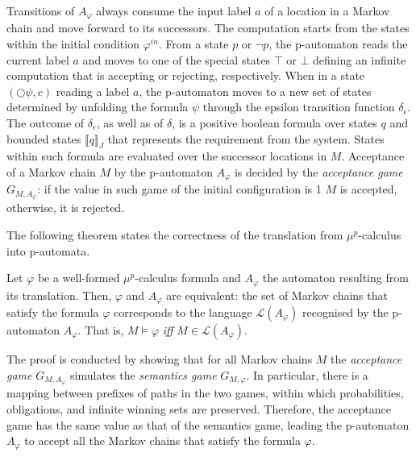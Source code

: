 \documentclass[a4paper,UKenglish]{oasics-v2016}
\begin{document}
Transitions of $A_\varphi$ always consume the input label $a$ of a 
location in a Markov chain and move forward to its successors.
The computation starts from the states within the initial condition 
$\varphi^{in}$.
From a state $p$ or $\neg p$, the p-automaton reads the current label $a$ and 
moves to one of the special states $\top$ or $\bot$ defining an infinite 
computation that is accepting or rejecting, respectively.
When in a state $(\bigcirc \psi, c)$ reading a label $a$, the p-automaton moves 
to a new set of states determined by unfolding the formula $\psi$ through the 
epsilon transition function $\delta_\epsilon$.
The outcome of $\delta_\epsilon$, as well as of $\delta$, is a positive boolean 
formula over states $q$ and bounded states $\llbracket q \rrbracket_J$ that 
represents the requirement from the system.
States within such formula are evaluated over the successor locations in $M$.
Acceptance of a Markov chain $M$ by the p-automaton $A_\varphi$ is decided by 
the \emph{acceptance game} $G_{M,A_\varphi}$: if the value in such game of the 
initial configuration is 1 $M$ is accepted, otherwise, it is rejected. 
%

The following theorem states the correctness of the translation 
from $\mu^p$-calculus into p-automata.
\begin{theorem}\label{the:MupToPaut}
	Let $\varphi$ be a well-formed $\mu^p$-calculus formula and $A_\varphi$ the 
	automaton resulting from its translation. 
	Then, $\varphi$ and $A_\varphi$ are equivalent: the set of Markov chains 
	that 
	satisfy the formula $\varphi$ corresponds to the language 
	$\mathcal{L}(A_\varphi)$ recognised by the p-automaton $A_\varphi$.
	That is, 
	$M\!\models\!\varphi$ \emph{iff} $M\!\in\!\mathcal{L}(A_\varphi)$.
\end{theorem}
The proof is conducted by showing that for all Markov chains $M$ the 
\emph{acceptance game} $G_{M,A_\varphi}$ simulates the \emph{semantics game} 
$G_{M, \varphi}$.
In particular, there is a mapping between prefixes of paths in the two games, 
within which probabilities, obligations, and infinite winning sets are 
preserved.
Therefore, the acceptance game has the same value as that of the semantics 
game, leading the p-automaton $A_\varphi$ to accept all the Markov chains that 
satisfy the formula $\varphi$.
\end{document}
